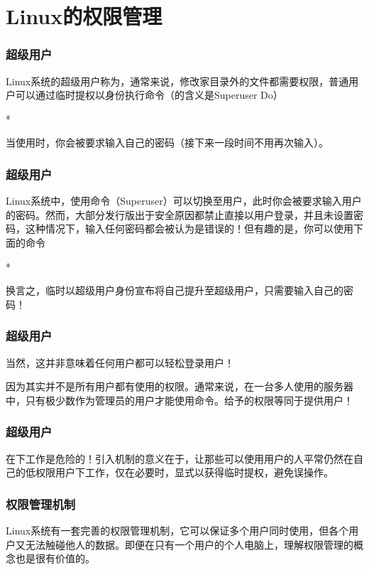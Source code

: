\section{Linux的权限管理}

\begin{frame}
    \frametitle{超级用户}
    Linux系统的超级用户称为，通常来说，修改家目录外的文件都需要权限，普通用户可以通过临时提权以身份执行命令（的含义是Superuser Do）
    \begin{Code}*
        
    \end{Code}
    当使用时，你会被要求输入自己的密码（接下来一段时间不用再次输入）。
\end{frame}

\begin{frame}
    \frametitle{超级用户}
    Linux系统中，使用命令（Superuser）可以切换至用户，此时你会被要求输入用户的密码。然而，大部分发行版出于安全原因都禁止直接以用户登录，并且未设置密码，这种情况下，输入任何密码都会被认为是错误的！但有趣的是，你可以使用下面的命令
    \begin{Code}*
        
    \end{Code}
    换言之，临时以超级用户身份宣布将自己提升至超级用户，只需要输入自己的密码！
\end{frame}

\begin{frame}
    \frametitle{超级用户}
    当然，这并非意味着任何用户都可以轻松登录用户！
    
    因为其实并不是所有用户都有使用的权限。通常来说，在一台多人使用的服务器中，只有极少数作为管理员的用户才能使用命令。给予的权限等同于提供用户！
\end{frame}

\begin{frame}
    \frametitle{超级用户}
    在下工作是危险的！引入机制的意义在于，让那些可以使用用户的人平常仍然在自己的低权限用户下工作，仅在必要时，显式以获得临时提权，避免误操作。
\end{frame}

\begin{frame}
    \frametitle{权限管理机制}
    Linux系统有一套完善的权限管理机制，它可以保证多个用户同时使用，但各个用户又无法触碰他人的数据。即便在只有一个用户的个人电脑上，理解权限管理的概念也是很有价值的。
\end{frame}

